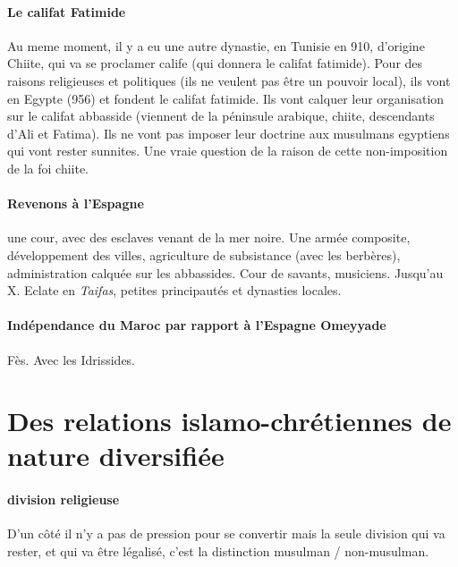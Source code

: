 \paragraph{Le califat Fatimide } Au meme moment, il y a eu une autre dynastie, en Tunisie en 910, d'origine Chiite, qui va se proclamer calife (qui donnera le califat fatimide). Pour des raisons religieuses et politiques (ils ne veulent pas être un pouvoir local), ils vont en Egypte (956) et fondent le califat fatimide.   Ils vont calquer leur organisation sur le califat abbasside (viennent de la péninsule arabique, chiite, descendants d'Ali et Fatima). Ils ne vont pas imposer leur doctrine aux musulmans egyptiens qui vont rester sunnites.  Une vraie question de la raison de cette non-imposition de la foi chiite.

\paragraph{Revenons à l'Espagne} une cour, avec des esclaves venant de la mer noire. Une armée composite, développement des villes, agriculture de subsistance (avec les berbères), administration calquée sur les abbassides. Cour de savants, musiciens. Jusqu'au X. Eclate en \textit{Taifas}, petites principautés et dynasties locales. 

\paragraph{Indépendance du Maroc par rapport à l'Espagne Omeyyade} Fès. Avec les Idrissides. 






\section{Des relations islamo-chrétiennes de nature diversifiée}

\paragraph{division religieuse} D'un côté il n'y a pas de pression pour se convertir mais la seule division qui va rester, et qui va être légalisé, c'est la distinction musulman / non-musulman. 


